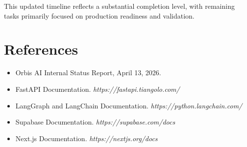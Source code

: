 \documentclass[12pt]{article}
\begin{document}
This updated timeline reflects a substantial completion level, with remaining tasks primarily focused on production readiness and validation.

\section*{References}
\begin{itemize}
    \item Orbis AI Internal Status Report, April 13, 2026.
    \item FastAPI Documentation. \textit{https://fastapi.tiangolo.com/}
    \item LangGraph and LangChain Documentation. \textit{https://python.langchain.com/}
    \item Supabase Documentation. \textit{https://supabase.com/docs}
    \item Next.js Documentation. \textit{https://nextjs.org/docs}
\end{itemize}
\end{document}
